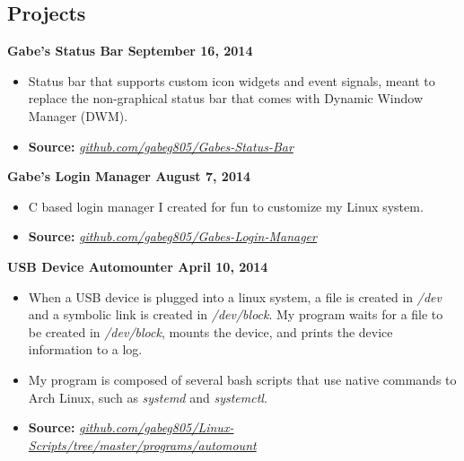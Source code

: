 \documentclass[margin,line]{resume}
\begin{document}
\begin{resume}
    
    \section{\mysidestyle Projects}
    
    \textbf{Gabe's Status Bar \hfill September 16, 2014}
    \vspace{1mm}
    \begin{itemize}
        \item Status bar that supports custom icon widgets and event signals, meant
        to replace the non-graphical status bar that comes with Dynamic Window
        Manager (DWM).
        \item \textbf{Source: } \textsl{\href{http://github.com/gabeg805/Gabes-Status-Bar}{github.com/gabeg805/Gabes-Status-Bar}}
    \end{itemize}
    
    \textbf{Gabe's Login Manager \hfill August 7, 2014}
    \vspace{1mm}
    \begin{itemize}
        \item C based login manager I created for fun to customize my Linux system.
        \item \textbf{Source: } \textsl{\href{http://github.com/gabeg805/Gabes-Login-Manager}{github.com/gabeg805/Gabes-Login-Manager}}
    \end{itemize}
    \vspace{-1mm}

    \textbf{USB Device Automounter \hfill April 10, 2014}
    \vspace{1mm}
    \begin{itemize}
        \item When a USB device is plugged into a linux system, a file is created in
        \textsl{/dev} and a symbolic link is created in \textsl{/dev/block}. My program waits for a
        file to be created in \textsl{/dev/block}, mounts the device, and prints the device
        information to a log.
        \item My program is composed of several bash scripts that use native commands to Arch Linux, such as \textsl{systemd} and \textsl{systemctl}. 
        \item \textbf{Source: } \textsl{\href{http://github.com/gabeg805/Linux-Scripts/tree/master/programs/automount}{github.com/gabeg805/Linux-Scripts/tree/master/programs/automount}}
    \end{itemize}
    \vspace{-1mm}
    

\end{resume}
\end{document}
